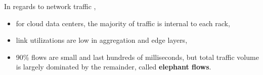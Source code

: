 \par In regards to network traffic \cite{mori_identifying_2004, benson_network_2010},

\begin{itemize}
    \item for cloud data centers, the majority of traffic is internal to each rack,
    \item link utilizations are low in aggregation and edge layers,
    \item 90\% flows are small and last hundreds of milliseconds, but total traffic volume is largely dominated by the remainder, called \textbf{elephant flows}.
\end{itemize}

\par 
